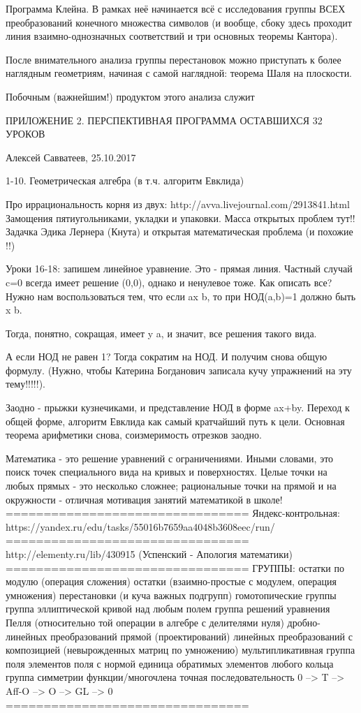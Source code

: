Программа Клейна. В рамках неё начинается всё с исследования группы ВСЕХ 
преобразований конечного множества символов (и вообще, сбоку здесь проходит
линия взаимно-однозначных соответствий и три основных теоремы Кантора).

После внимательного анализа группы перестановок можно приступать к более
наглядным геометриям, начиная с самой наглядной: теорема Шаля на плоскости.

Побочным (важнейшим!) продуктом этого анализа служит

ПРИЛОЖЕНИЕ 2. ПЕРСПЕКТИВНАЯ ПРОГРАММА ОСТАВШИХСЯ 32 УРОКОВ

Алексей Савватеев, 25.10.2017

1-10. Геометрическая алгебра (в т.ч. алгоритм Евклида)

Про иррациональность корня из двух: http://avva.livejournal.com/2913841.html
Замощения пятиугольниками, укладки и упаковки. Масса открытых проблем тут!!
Задачка Эдика Лернера (Кнута) и открытая математическая проблема (и похожие !!)

Уроки 16-18: запишем линейное уравнение. Это - прямая линия. Частный случай 
c=0 всегда имеет решение (0,0), однако и ненулевое тоже. Как описать все? Нужно
нам воспользоваться тем, что если ax \del b, то при НОД(a,b)=1 должно быть x \del b.

Тогда, понятно, сокращая, имеет y \del a, и значит, все решения такого вида.

А если НОД не равен 1? Тогда сократим на НОД. И получим снова общую формулу.
(Нужно, чтобы Катерина Богданович записала кучу упражнений на эту тему!!!!!).

Заодно - прыжки кузнечиками, и представление НОД в форме ax+by. Переход к 
общей форме, алгоритм Евклида как самый кратчайший путь к цели. Основная
теорема арифметики снова, соизмеримость отрезков заодно. 

Математика - это решение уравнений с ограничениями. Иными словами, это
поиск точек специального вида на кривых и поверхностях. Целые точки на
любых прямых - это несколько сложнее; рациональные точки на прямой и 
на окружности - отличная мотивация занятий математикой в школе!
================================
Яндекс-контрольная:
https://yandex.ru/edu/tasks/55016b7659aa4048b3608eec/run/
================================
http://elementy.ru/lib/430915
(Успенский - Апология математики)
================================
ГРУППЫ:
остатки по модулю (операция сложения)
остатки (взаимно-простые с модулем, операция умножения)
перестановки (и куча важных подгрупп)
гомотопические группы
группа эллиптической кривой над любым полем
группа решений уравнения Пелля (относительно той операции в алгебре с делителями нуля)
дробно-линейных преобразований прямой (проектирований)
линейных преобразований с композицией (невырожденных матриц по умножению)
мультипликативная группа поля
элементов поля с нормой единица
обратимых элементов любого кольца
группа симметрии функции/многочлена
точная последовательность 0 --> T --> Aff-O --> O --> GL --> 0
================================

